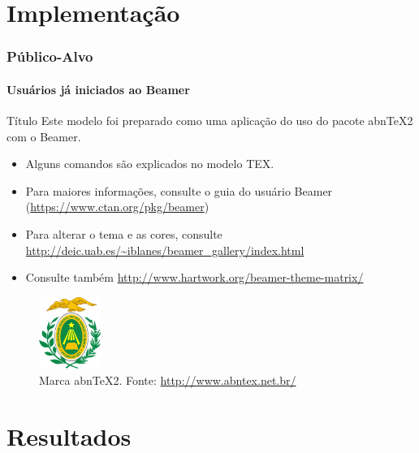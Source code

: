 \documentclass[aspectratio=1610]{beamer}
\begin{document}
\section{Implementação}
\begin{frame}
\frametitle{Público-Alvo}
\framesubtitle{Usuários já iniciados ao Beamer}

\begin{block}{Título}
 Este modelo foi preparado como uma aplicação do uso do pacote abnTeX2 com o Beamer.
\end{block}

\begin{itemize}
 \item Alguns comandos são explicados no modelo TEX. \pause
 
 \item Para maiores informações, consulte o guia do usuário Beamer 
 (\url{https://www.ctan.org/pkg/beamer})\pause
 
 \item Para alterar o tema e as cores, consulte 
 \url{http://deic.uab.es/~iblanes/beamer_gallery/index.html}
 
 \item Consulte também \url{http://www.hartwork.org/beamer-theme-matrix/}
\end{itemize}

\end{frame}


\begin{frame}

\begin{figure}
  \centering
  \includegraphics[width=2cm]{ufrn.jpg}
  \caption{Marca abnTeX2. Fonte: \url{http://www.abntex.net.br/}}
\end{figure}

\end{frame}

\section{Resultados}
\end{document}
